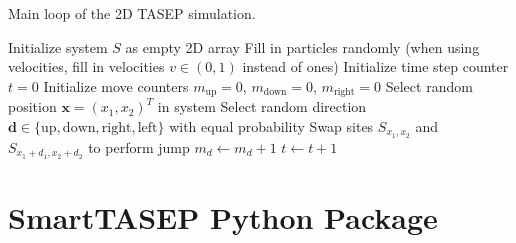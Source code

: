 \begin{algorithm}[H]
    \caption{Main loop of the 2D TASEP simulation.}
    \label{alg:2d-tasep}
    \begin{algorithmic}
        \State Initialize system $S$ as empty 2D array
        \State Fill in particles randomly (when using velocities, fill in velocities $v\in (0,1)$ instead of ones)
        \State Initialize time step counter $t=0$
        \State Initialize move counters $m_{\text{up}}=0$, $m_{\text{down}}=0$, $m_{\text{right}}=0$
            \State Select random position $\bm{x}=(x_1,x_2)^T$ in system
                \State Select random direction $\bm{d} \in \{\text{up}, \text{down}, \text{right}, \text{left}\}$ with equal probability
                    \State Swap sites $S_{x_1,x_2}$ and $S_{x_1+d_1,x_2+d_2}$ to perform jump
                    \State $m_d \gets m_d + 1$
                \EndIf
            \EndIf
            \State $t \gets t+1$
        \EndWhile
\end{algorithmic}
\end{algorithm}

  
\section{SmartTASEP Python Package}
\label{sec:implementation-smarttasep}

